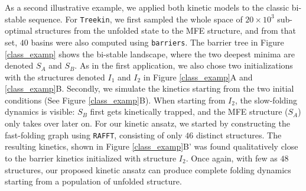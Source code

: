 As a second illustrative example, we applied both kinetic models to the classic bi-stable sequence. For \texttt{Treekin}, we first sampled the whole space of \(20 \times 10^3\) sub-optimal structures from the unfolded state to the MFE structure, and from that set, $40$ basins were also computed using \texttt{barriers}. The barrier tree in Figure \ref{class_examp} shows the bi-stable landscape, where the two deepest minima are denoted $S_A$ and $S_B$. As in the first application, we also chose two initializations with the structures denoted $I_1$ and $I_2$ in Figure \ref{class_examp}A and \ref{class_examp}B. Secondly, we simulate the kinetics starting from the two initial conditions (See Figure \ref{class_examp}B). When starting from $I_2$, the slow-folding dynamics is visible:  $S_B$ first gets kinetically trapped, and the MFE structure ($S_A$) only takes over later on. For our kinetic ansatz, we started by constructing the fast-folding graph using \texttt{RAFFT}, consisting of only $46$ distinct structures. The resulting kinetics, shown in Figure \ref{class_examp}B' was found qualitatively close to the barrier kinetics initialized with structure $I_2$. Once again, with few as $48$ structures, our proposed kinetic ansatz can produce complete folding dynamics starting from a population of unfolded structure.

